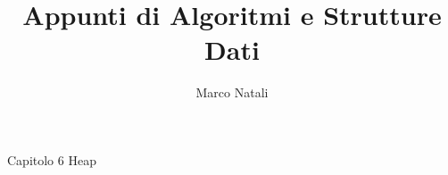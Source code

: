 \documentclass[a4paper]{report}
\begin{document}
\title{Appunti di Algoritmi e Strutture Dati}
\author{Marco Natali}
\maketitle

 Capitolo 6 Heap
\end{document}
